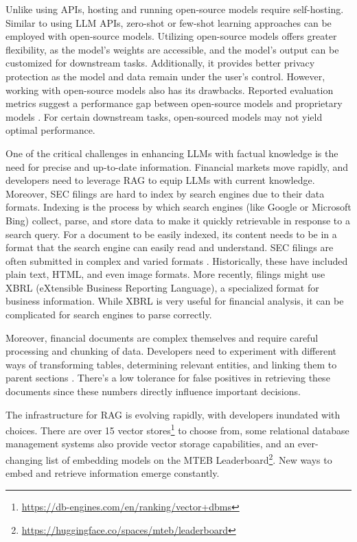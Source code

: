 Unlike using APIs, hosting and running open-source models require self-hosting. Similar to using LLM APIs, zero-shot or few-shot learning approaches can be employed with open-source models. Utilizing open-source models offers greater flexibility, as the model’s weights are accessible, and the model’s output can be customized for downstream tasks. Additionally, it provides better privacy protection as the model and data remain under the user’s control. However, working with open-source models also has its drawbacks. Reported evaluation metrics suggest a performance gap between open-source models and proprietary models \cite{Zhao.31Mar2023}. For certain downstream tasks, open-sourced models may not yield optimal performance.

One of the critical challenges in enhancing LLMs with factual knowledge is the need for precise and up-to-date information. Financial markets move rapidly, and developers need to leverage RAG to equip LLMs with current knowledge. Moreover, SEC filings are hard to index by search engines due to their data formats. Indexing is the process by which search engines (like Google or Microsoft Bing) collect, parse, and store data to make it quickly retrievable in response to a search query. For a document to be easily indexed, its content needs to be in a format that the search engine can easily read and understand. SEC filings are often submitted in complex and varied formats \cite{Zhang.18Feb2023}. Historically, these have included plain text, HTML, and even image formats. More recently, filings might use XBRL (eXtensible Business Reporting Language), a specialized format for business information. While XBRL is very useful for financial analysis, it can be complicated for search engines to parse correctly.

Moreover, financial documents are complex themselves and require careful processing and chunking of data. Developers need to experiment with different ways of transforming tables, determining relevant entities, and linking them to parent sections \cite{Zhang.18Feb2023}. There's a low tolerance for false positives in retrieving these documents since these numbers directly influence important decisions.

The infrastructure for RAG is evolving rapidly, with developers inundated with choices. There are over 15 vector stores\footnote{\url{https://db-engines.com/en/ranking/vector+dbms}} to choose from, some relational database management systems also provide vector storage capabilities, and an ever-changing list of embedding models on the MTEB Leaderboard\footnote{\url{https://huggingface.co/spaces/mteb/leaderboard}}. New ways to embed and retrieve information emerge constantly.

